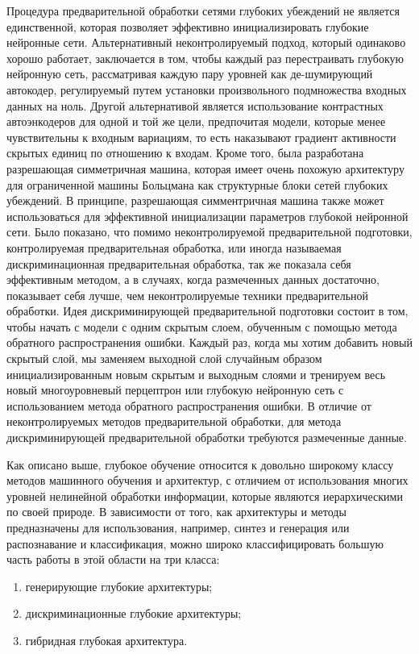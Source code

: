 Процедура предварительной обработки сетями глубоких убеждений не является единственной, которая позволяет эффективно инициализировать глубокие нейронные сети. Альтернативный неконтролируемый подход, который одинаково хорошо работает, заключается в том, чтобы каждый раз перестраивать глубокую нейронную сеть, рассматривая каждую пару уровней как де-шумирующий автокодер, регулируемый путем установки произвольного подмножества входных данных на ноль. Другой альтернативой является использование контрастных автоэнкодеров для одной и той же цели, предпочитая модели, которые менее чувствительны к входным вариациям, то есть наказывают градиент активности скрытых единиц по отношению к входам. Кроме того, была разработана разрешающая симметричная машина, которая имеет очень похожую архитектуру для ограниченной машины Больцмана как структурные блоки сетей глубоких убеждений. В принципе, разрешающая симментричная машина также может использоваться для эффективной инициализации параметров глубокой нейронной сети. Было показано, что помимо неконтролируемой предварительной подготовки, контролируемая предварительная обработка, или иногда называемая дискриминационная предварительная обработка, так же показала себя эффективным методом, а в случаях, когда размеченных данных достаточно, показывает себя лучше, чем неконтролируемые техники предварительной обработки. Идея дискриминирующей предварительной подготовки состоит в том, чтобы начать с модели с одним скрытым слоем, обученным с помощью метода обратного распространения ошибки. Каждый раз, когда мы хотим добавить новый скрытый слой, мы заменяем выходной слой случайным образом инициализированным новым скрытым и выходным слоями и тренируем весь новый многоуровневый перцептрон или глубокую нейронную сеть с использованием метода обратного распространения ошибки. В отличие от неконтролируемых методов предварительной обработки, для метода дискриминирующей предварительной обработки требуются размеченные данные.

Как описано выше, глубокое обучение относится к довольно широкому классу методов машинного обучения и архитектур, с отличием от использования многих уровней нелинейной обработки информации, которые являются иерархическими по своей природе. В зависимости от того, как архитектуры и методы предназначены для использования, например, синтез и генерация или распознавание и классификация, можно широко классифицировать большую часть работы в этой области на три класса:
\begin{enumerate}
	\item генерирующие глубокие архитектуры;
	\item дискриминационные глубокие архитектуры;
	\item гибридная глубокая архитектура.
\end{enumerate}

